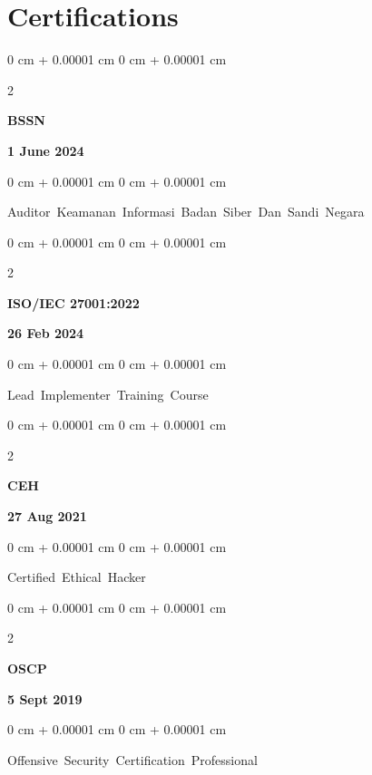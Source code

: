 \documentclass[10pt, letterpaper]{article}
\newenvironment{onecolentry}{
    \begin{adjustwidth}{
        0 cm + 0.00001 cm
    }{
        0 cm + 0.00001 cm
    }
}{
    \end{adjustwidth}
} %
\newenvironment{twocolentry}[2][]{
    \onecolentry
    \def\secondColumn{#2}
    \setcolumnwidth{\fill, 4.5 cm}
    \begin{paracol}{2}
}{
    \switchcolumn \raggedleft \secondColumn
    \end{paracol}
    \endonecolentry
} %
\begin{document}
    
    \section{Certifications}
     \vspace{0.35 cm}
      \begin{samepage}
    	\begin{twocolentry}{\textbf{1 June 2024}}
    		\textbf{BSSN }
    	\end{twocolentry}
    	
    	\vspace{0.10 cm}
    	
    	\begin{onecolentry}
    		\mbox{Auditor Keamanan Informasi  Badan Siber Dan Sandi Negara} \end{onecolentry}
    \end{samepage}
    
     \vspace{0.20 cm}
    \begin{samepage}
    	\begin{twocolentry}{\textbf{26 Feb 2024}}
    		\textbf{ISO/IEC 27001:2022}
    	\end{twocolentry}
    	
    	\vspace{0.10 cm}
    	
    	\begin{onecolentry}
    		\mbox{Lead Implementer Training Course} \end{onecolentry}
    \end{samepage}
    
		 \vspace{0.20 cm}
	     \begin{samepage}
		\begin{twocolentry}{\textbf{27 Aug 2021}}
			\textbf{CEH}
		\end{twocolentry}
		
		\vspace{0.10 cm}
		
		\begin{onecolentry}
			\mbox{Certified Ethical Hacker} \end{onecolentry}
	\end{samepage}


          \vspace{0.20 cm}
        \begin{samepage}
            \begin{twocolentry}{\textbf{5 Sept 2019}}
                \textbf{OSCP}
            \end{twocolentry}

            \vspace{0.10 cm}
            
            \begin{onecolentry}
\mbox{Offensive Security Certification Professional} \end{onecolentry}
        \end{samepage}
\end{document}
